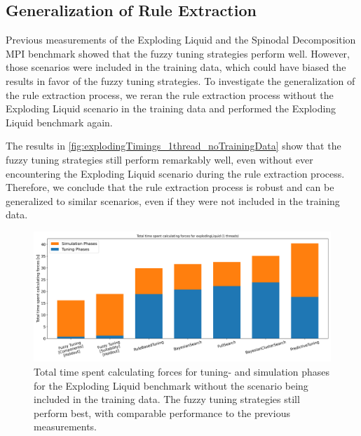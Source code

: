\newpage

\subsection{Generalization of Rule Extraction}

Previous measurements of the Exploding Liquid and the Spinodal Decomposition MPI benchmark showed that the fuzzy tuning strategies perform well. However, those scenarios were included in the training data, which could have biased the results in favor of the fuzzy tuning strategies. To investigate the generalization of the rule extraction process, we reran the rule extraction process without the Exploding Liquid scenario in the training data and performed the Exploding Liquid benchmark again.

The results in \autoref{fig:explodingTimings_1thread_noTrainingData} show that the fuzzy tuning strategies still perform remarkably well, even without ever encountering the Exploding Liquid scenario during the rule extraction process. Therefore, we conclude that the rule extraction process is robust and can be generalized to similar scenarios, even if they were not included in the training data.

\begin{figure}[H]
    \centering

    \includegraphics[width=\columnwidth,trim={0cm 0 0cm 0.9cm},clip]{figures/Benchmark/ExplodingLiquidHoldout/total_time_explodingLiquid_1.png}
    \caption[
        Benchmark Results for the Exploding Liquid Scenario (Holdout)
    ]{
        Total time spent calculating forces for tuning- and simulation phases for the Exploding Liquid benchmark without the scenario being included in the training data. The fuzzy tuning strategies still perform best, with comparable performance to the previous measurements.
    }
    \label{fig:explodingTimings_1thread_noTrainingData}
\end{figure}